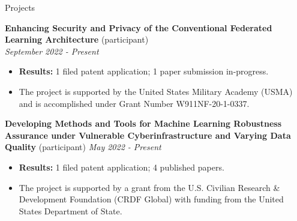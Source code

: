 \documentclass[10pt]{resume} %
\begin{document}


\begin{rSection}{Projects}

{\bf Enhancing Security and Privacy of the Conventional Federated Learning Architecture} (participant) \\
\hspace*{\fill} {\em September 2022 - Present}
\vspace{-0.3cm}
\begin{itemize}
\itemsep-0.5em 
\item \textbf{Results:} 1 filed patent application; 1 paper submission in-progress. 
\item The project is supported by the United States Military Academy (USMA) and is accomplished under Grant Number W911NF-20-1-0337. 
\end{itemize}

{\bf Developing Methods and Tools for Machine Learning Robustness Assurance under Vulnerable Cyberinfrastructure and Varying Data Quality} (participant) \hspace*{\fill} {\em May 2022 - Present}
\vspace{-0.4cm}
\begin{itemize}
\itemsep-0.5em 
\item \textbf{Results:} 1 filed patent application; 4 published papers.
\item The project is supported by a grant from the U.S. Civilian Research \& Development Foundation (CRDF Global) with funding from the United States Department of State. 
\end{itemize}


\end{rSection}
\end{document}
